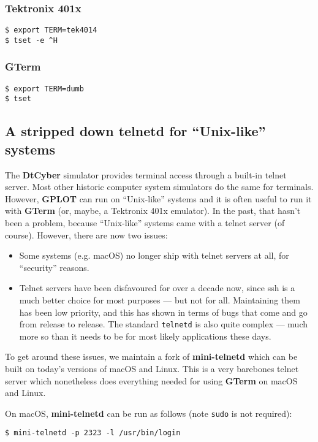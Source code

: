 \documentclass[a4paper,twoside,11pt]{article}
\newcommand{\newpara}{\par\vspace{4mm}\noindent}
\begin{document}
\subsubsection{Tektronix 401x}
\begin{lstlisting}
$ export TERM=tek4014
$ tset -e ^H
\end{lstlisting}

\subsubsection{GTerm}
\begin{lstlisting}
$ export TERM=dumb
$ tset
\end{lstlisting}

\subsection{A stripped down telnetd for ``Unix-like'' systems}
\newpara
The \textbf{DtCyber} simulator provides terminal access through a built-in telnet server. Most other historic computer system simulators
do the same for terminals. However, \textbf{GPLOT} can run on ``Unix-like'' systems and it is often useful to run it with
\textbf{GTerm} (or, maybe, a Tektronix 401x emulator). In the past, that hasn't been a problem, because ``Unix-like'' systems
came with a telnet server (of course). However, there are now two issues:
\begin{itemize}
\item Some systems (e.g. macOS) no longer ship with telnet servers at all, for ``security'' reasons.
\item Telnet servers have been disfavoured for over a decade now, since ssh is a much better choice for most purposes --- but
  not for all. Maintaining them has been low priority, and this has shown in terms of bugs that come and go from release to
  release. The standard \texttt{telnetd} is also quite complex --- much more so than it needs to be for most likely applications
  these days.
\end{itemize}

\newpara
To get around these issues, we maintain a fork of \textbf{mini-telnetd} which can be built on today's versions of macOS and Linux.
This is a very barebones telnet server which nonetheless does everything needed for using \textbf{GTerm} on macOS and Linux.

\newpara
On macOS, \textbf{mini-telnetd} can be run as follows (note \texttt{sudo} is not required):
\begin{lstlisting}
$ mini-telnetd -p 2323 -l /usr/bin/login
\end{lstlisting}
\end{document}
